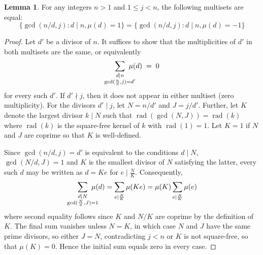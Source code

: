 \documentclass{article}
\numberwithin{equation}{section}
\theoremstyle{definition}
\newtheorem{lemma}[definition]{\bf {Lemma}}
\begin{document}
\begin{lemma}\label{lem:05}
    For any integers $n>1$ and $1\leq j<n$, the following multisets are equal:
    \[\{\gcd(n/d, j):d\mid n, \mu(d)=1\}=\{\gcd(n/d, j):d\mid n, \mu(d)=-1\}\]
\end{lemma}
\begin{proof}
    Let $d'$ be a divisor of $n$. It suffices to show that the multiplicities of $d'$ in both multisets are the same, or equivalently 
    \[
        \sum_{\substack{d\mid n\\\gcd(\frac{n}{d},j)=d'}}\hspace{-4mm}\mu(d)\hspace{1mm}=\hspace{1mm}0
    \]
    for every such $d'$. If $d'\nmid j$, then it does not appear in either multiset (zero multiplicity). For the divisors $d'\mid j$, let $N=n/d'$ and $J=j/d'$. Further, let $K$ denote the largest divisor $k\mid N$ such that $\operatorname{rad}(\gcd(N,J))=\operatorname{rad}(k)$ where $\operatorname{rad}(k)$ is the square-free kernel of $k$ with $\operatorname{rad}(1)=1$. Let $K=1$ if $N$ and $J$ are coprime so that $K$ is well-defined. 
    
    Since $\gcd(n/d,j)=d'$ is equivalent to the conditions $d\mid N$, $\gcd(N/d,J)=1$ and $K$ is the smallest divisor of $N$ satisfying the latter, every such $d$ may be written as $d=Ke$ for $e\mid \frac{N}{K}$. Consequently, 
    \[\sum_{\substack{d\mid N\\\gcd(\frac{N}{d},J)=1}}\hspace{-4mm}\mu(d)=\sum_{e\mid \frac{N}{K}}\mu(Ke)=\mu(K)\sum_{e\mid\frac{N}{K}}\mu(e)\]
    where second equality follows since $K$ and $N/K$ are coprime by the definition of $K$. The final sum vanishes unless $N=K$, in which case $N$ and $J$ have the same prime divisors, so either $J=N$, contradicting $j<n$ or $K$ is not square-free, so that $\mu(K)=0$. Hence the initial sum equals zero in every case.
\end{proof}
\end{document}
